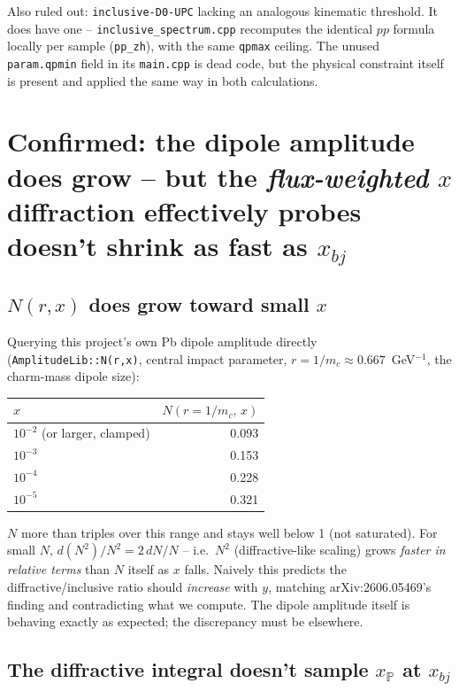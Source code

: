 \documentclass[11pt]{article}
\begin{document}
Also ruled out: \texttt{inclusive-D0-UPC} lacking an analogous
kinematic threshold. It does have one -- \texttt{inclusive\_spectrum.cpp}
recomputes the identical $pp$ formula locally per sample
(\texttt{pp\_zh}), with the same \texttt{qpmax} ceiling. The unused
\texttt{param.qpmin} field in its \texttt{main.cpp} is dead code, but the
physical constraint itself is present and applied the same way in both
calculations.

\section{Confirmed: the dipole amplitude does grow -- but the
\emph{flux-weighted} $x$ diffraction effectively probes doesn't shrink
as fast as $x_{bj}$}

\subsection{$N(r,x)$ does grow toward small $x$}

Querying this project's own Pb dipole amplitude directly
(\texttt{AmplitudeLib::N(r,x)}, central impact parameter,
$r=1/m_c\approx0.667$~GeV$^{-1}$, the charm-mass dipole size):

\begin{center}
\begin{tabular}{lr}
\toprule
$x$ & $N(r{=}1/m_c,\,x)$ \\
\midrule
$10^{-2}$ (or larger, clamped) & 0.093 \\
$10^{-3}$ & 0.153 \\
$10^{-4}$ & 0.228 \\
$10^{-5}$ & 0.321 \\
\bottomrule
\end{tabular}
\end{center}

$N$ more than triples over this range and stays well below 1 (not
saturated). For small $N$, $d(N^2)/N^2 = 2\,dN/N$ -- i.e.\ $N^2$
(diffractive-like scaling) grows \emph{faster in relative terms} than
$N$ itself as $x$ falls. Naively this predicts the diffractive/inclusive
ratio should \emph{increase} with $y$, matching arXiv:2606.05469's
finding and contradicting what we compute. The dipole amplitude itself is
behaving exactly as expected; the discrepancy must be elsewhere.

\subsection{The diffractive integral doesn't sample $x_{\mathbb P}$ at
$x_{bj}$}
\end{document}
